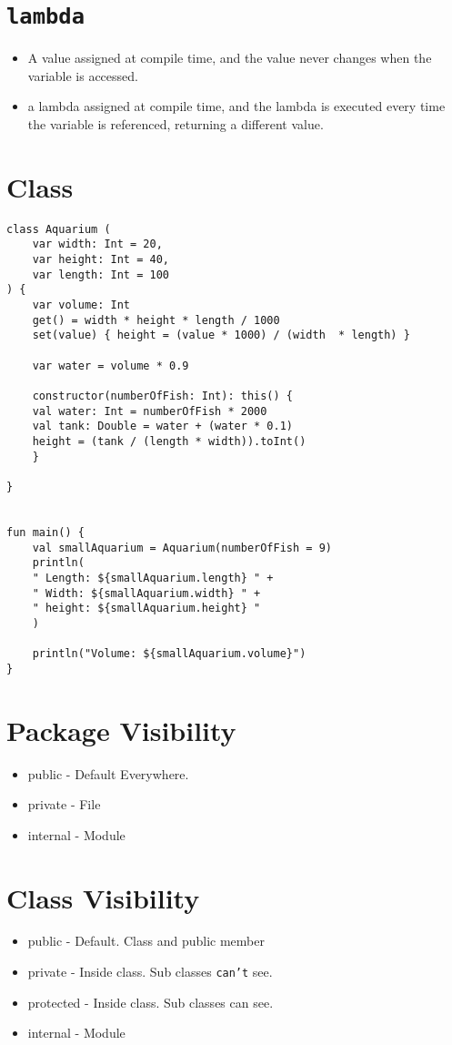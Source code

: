 \documentclass[11pt]{article}
\begin{document}
\section*{\texttt{lambda}}
\label{sec:org2a8c4f6}
\begin{itemize}
\item A value assigned at compile time, and the value never changes when
the variable is accessed.

\item a lambda assigned at compile time, and the lambda is executed
every time the variable is referenced, returning a different
value.
\end{itemize}
\section*{Class}
\label{sec:orge9a59e4}
\begin{verbatim}
class Aquarium (
    var width: Int = 20,
    var height: Int = 40,
    var length: Int = 100
) {
    var volume: Int 
	get() = width * height * length / 1000
	set(value) { height = (value * 1000) / (width  * length) }

    var water = volume * 0.9

    constructor(numberOfFish: Int): this() {
	val water: Int = numberOfFish * 2000
	val tank: Double = water + (water * 0.1)
	height = (tank / (length * width)).toInt()
    }

}


fun main() {
    val smallAquarium = Aquarium(numberOfFish = 9)
    println(
	" Length: ${smallAquarium.length} " +
	" Width: ${smallAquarium.width} " +
	" height: ${smallAquarium.height} "
    )

    println("Volume: ${smallAquarium.volume}")
}
\end{verbatim}
\section*{Package Visibility}
\label{sec:org510cb8e}
\begin{itemize}
\item public - Default Everywhere.
\item private - File
\item internal - Module
\end{itemize}
\section*{Class Visibility}
\label{sec:org31ad2f2}
\begin{itemize}
\item public - Default. Class and public member
\item private - Inside class. Sub classes \texttt{can't} see.
\item protected - Inside class. Sub classes can see.
\item internal - Module
\end{itemize}
\end{document}
